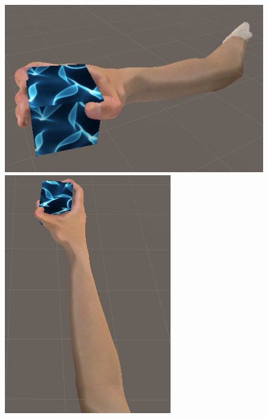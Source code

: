 \documentclass{ltjsreport}
\begin{document}
		\begin{figure}[H]
		\centering
		\begin{minipage}{0.4\columnwidth}
		\centering
		\includegraphics[width = \columnwidth]{../figs/grapcube_side.png}
		\end{minipage}
		\hspace{0.04\columnwidth}
		\begin{minipage}{0.4\columnwidth}
		\centering
		\includegraphics[width = \columnwidth]{../figs/grapcube_up.png}
		\end{minipage}
		\caption{}
		\end{figure}
		
\end{document}
